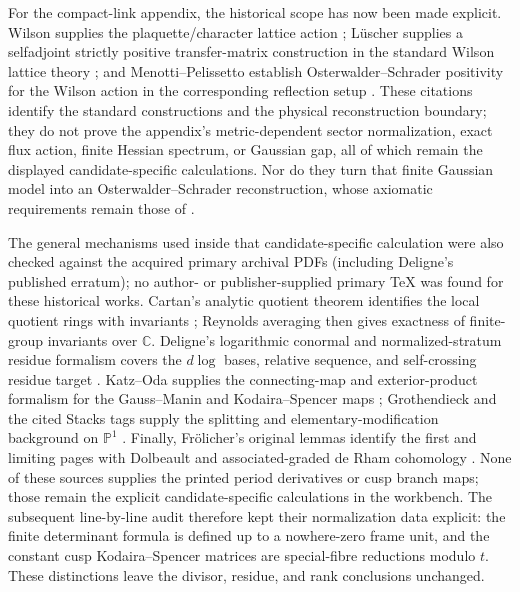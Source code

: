 For the compact-link appendix, the historical scope has now been made
explicit.  Wilson supplies the plaquette/character lattice action
\cite{Wilson_1974}; L\"uscher supplies a selfadjoint strictly positive
transfer-matrix construction in the standard Wilson lattice theory
\cite{Luscher_1977}; and Menotti--Pelissetto establish
Osterwalder--Schrader positivity for the Wilson action in the corresponding
reflection setup \cite{MenottiPelissetto_1987}.  These citations identify the
standard constructions and the physical reconstruction boundary; they do
not prove the appendix's metric-dependent sector normalization, exact flux
action, finite Hessian spectrum, or Gaussian gap, all of which remain the
displayed candidate-specific calculations.  Nor do they turn that finite
Gaussian model into an Osterwalder--Schrader reconstruction, whose axiomatic
requirements remain those of
\cite{OsterwalderSchrader1973,OsterwalderSchrader1975}.

The general mechanisms used inside that candidate-specific calculation were
also checked against the acquired primary archival PDFs (including Deligne's
published erratum); no author- or publisher-supplied primary TeX was found for
these historical works.  Cartan's analytic quotient theorem
identifies the local quotient rings with invariants
\cite[\S1, Theorem~1, pp.~1--2]{Cartan1954Quotient}; Reynolds averaging then
gives exactness of finite-group invariants over $\mathbb C$.  Deligne's
logarithmic conormal and normalized-stratum residue formalism covers the
$d\log$ bases, relative sequence, and self-crossing residue target
\cite[Chapter~II, \S3.2--3.7, pp.~72--78]{Deligne1970}.  Katz--Oda supplies
the connecting-map and exterior-product formalism for the Gauss--Manin and
Kodaira--Spencer maps
\cite[\S2, equations~(5)--(10), pp.~202--204]{KatzOda1968}; Grothendieck and
the cited Stacks tags supply the splitting and elementary-modification
background on $\mathbb P^1$ \cite[Theorem~2.1, p.~126]{Grothendieck1957}.
Finally, Fr\"olicher's original lemmas identify the first and limiting pages
with Dolbeault and associated-graded de Rham cohomology
\cite[p.~643]{Frolicher1955}.  None of these sources supplies the printed
period derivatives or cusp branch maps; those remain the explicit
candidate-specific calculations in the workbench.  The subsequent
line-by-line audit therefore kept their normalization data explicit: the
finite determinant formula is defined up to a nowhere-zero frame unit, and
the constant cusp Kodaira--Spencer matrices are special-fibre reductions
modulo $t$.  These distinctions leave the divisor, residue, and rank
conclusions unchanged.

